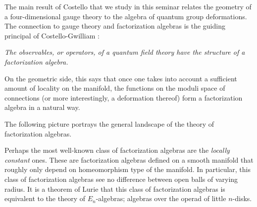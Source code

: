 \documentclass[10pt]{amsart}
\begin{document}
The main result of Costello \cite{CosYangian} that we study in this seminar relates the geometry of a four-dimensional gauge theory to the algebra of quantum group deformations. 
The connection to gauge theory and factorization algebras is the guiding principal of Costello-Gwilliam \cite{CG1, CG2}: 
\begin{center}
{\em The observables, or operators, of a quantum field theory have the structure of a factorization algebra.}
\end{center}
On the geometric side, this says that once one takes into account a sufficient amount of locality on the manifold, the functions on the moduli space of connections (or more interestingly, a deformation thereof) form a factorization algebra in a natural way.  

The following picture portrays the general landscape of the theory of factorization algebras. 
\ben
{}
\een
Perhaps the most well-known class of factorization algebras are the {\em locally constant} ones.
These are factorization algebras defined on a smooth manifold that roughly only depend on homeomorphism type of the manifold. 
In particular, this class of factorization algebras see no difference between open balls of varying radius. 
It is a theorem of Lurie \cite{LurieHA} that this class of factorization algebras is equivalent to the theory of $E_n$-algebras; algebras over the operad of little $n$-disks. 
\end{document}
